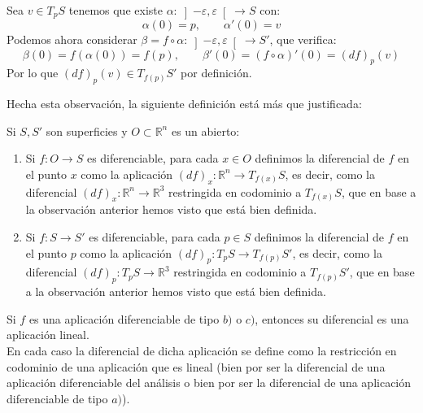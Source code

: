 \begin{enumerate}[label=\alph*)]
        Sea $v\in T_pS$ tenemos que existe $\alpha:\left]-\varepsilon,\varepsilon\right[\to S$ con:
        \begin{equation*}
            \alpha(0) = p, \qquad \alpha'(0) = v
        \end{equation*}
        Podemos ahora considerar $\beta = f\circ \alpha:\left]-\varepsilon,\varepsilon\right[\to S'$, que verifica:
        \begin{equation*}
            \beta(0) = f(\alpha(0)) = f(p), \qquad \beta'(0) = (f\circ \alpha)'(0) = (d f)_p(v)
        \end{equation*}
        Por lo que $(d f)_p(v)\in T_{f(p)}S'$ por definición.
\end{enumerate}

\noindent
Hecha esta observación, la siguiente definición está más que justificada:

\begin{definicion}
    Si $S,S'$ son superficies y $O\subset \mathbb{R}^n$ es un abierto:
    \begin{enumerate}[label=\alph*)]
        \item[$b)$] Si $f:O\to S$ es diferenciable, para cada $x\in O$ definimos la diferencial de $f$ en el punto $x$ como la aplicación $(df)_x:\mathbb{R}^n\to T_{f(x)}S$, es decir, como la diferencial $(d f)_x:\mathbb{R}^n\to\mathbb{R}^3$ restringida en codominio a $T_{f(x)}S$, que en base a la observación anterior hemos visto que está bien definida.
        \item[$c)$] Si $f:S\to S'$ es diferenciable, para cada $p\in S$ definimos la diferencial de $f$ en el punto $p$ como la aplicación $(d f)_p:T_pS\to T_{f(p)}S'$, es decir, como la diferencial $(d f)_p:T_pS\to\mathbb{R}^3$ restringida en codominio a $T_{f(p)}S'$, que en base a la observación anterior hemos visto que está bien definida.
    \end{enumerate}
\end{definicion}

\begin{observacion}
    Si $f$ es una aplicación diferenciable de tipo $b)$ o $c)$, entonces su diferencial es una aplicación lineal.\\

    \noindent
    En cada caso la diferencial de dicha aplicación se define como la restricción en codominio de una aplicación que es lineal (bien por ser la diferencial de una aplicación diferenciable del análisis o bien por ser la diferencial de una aplicación diferenciable de tipo $a)$).
\end{observacion}

